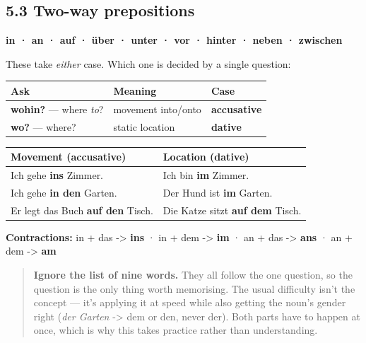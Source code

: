 \documentclass[
  11pt,
]{article}
\newcounter{none} %
\begin{document}
\subsection{5.3 Two-way prepositions}\label{two-way-prepositions}

\textbf{in · an · auf · über · unter · vor · hinter · neben · zwischen}

These take \emph{either} case. Which one is decided by a single
question:

{\def\LTcaptype{none} %
\begin{longtable}[]{@{}lll@{}}
\toprule\noalign{}
Ask & Meaning & Case \\
\midrule\noalign{}
\endhead
\bottomrule\noalign{}
\endlastfoot
\textbf{wohin?} --- where \emph{to}? & movement into/onto &
\textbf{accusative} \\
\textbf{wo?} --- where? & static location & \textbf{dative} \\
\end{longtable}
}

{\def\LTcaptype{none} %
\begin{longtable}[]{@{}
  >{\raggedright\arraybackslash}p{}
  >{\raggedright\arraybackslash}p{}@{}}
\toprule\noalign{}
\begin{minipage}[b]{\linewidth}\raggedright
Movement (accusative)
\end{minipage} & \begin{minipage}[b]{\linewidth}\raggedright
Location (dative)
\end{minipage} \\
\midrule\noalign{}
\endhead
\bottomrule\noalign{}
\endlastfoot
Ich gehe \textbf{ins} Zimmer. & Ich bin \textbf{im} Zimmer. \\
Ich gehe \textbf{in den} Garten. & Der Hund ist \textbf{im} Garten. \\
Er legt das Buch \textbf{auf den} Tisch. & Die Katze sitzt \textbf{auf
dem} Tisch. \\
\end{longtable}
}

\textbf{Contractions:} in + das -\textgreater{} \textbf{ins} · in + dem
-\textgreater{} \textbf{im} · an + das -\textgreater{} \textbf{ans} · an
+ dem -\textgreater{} \textbf{am}

\begin{quote}
\textbf{Ignore the list of nine words.} They all follow the one
question, so the question is the only thing worth memorising. The usual
difficulty isn't the concept --- it's applying it at speed while also
getting the noun's gender right (\emph{der Garten} -\textgreater{} dem
or den, never der). Both parts have to happen at once, which is why this
takes practice rather than understanding.
\end{quote}
\end{document}
